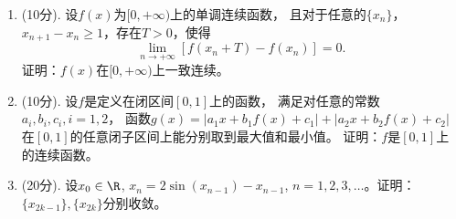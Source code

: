 \begin{enumerate}
    \item[五](10分). 设\(f(x)\)为\([0,+\infty)\)上的单调连续函数，
    且对于任意的\(\{x_n\}\)，\(x_{n+1}-x_n\ge1\)，存在\(T>0\)，使得
    \[
        \lim_{n\to+\infty}\left[f(x_n+T)-f(x_n)\right]=0.
    \]
    证明：\(f(x)\)在\([0,+\infty)\)上一致连续。
    \item[六](10分). 设\(f\)是定义在闭区间\([0,1]\)上的函数，
    满足对任意的常数\(a_i,b_i,c_i,i=1,2\)，
    函数\(g(x)=|a_1x+b_1f(x)+c_1|+|a_2x+b_2f(x)+c_2|\)
    在\([0,1]\)的任意闭子区间上能分别取到最大值和最小值。
    证明：\(f\)是\([0,1]\)上的连续函数。
    \item[七](20分). 设\(x_0\in\R\), \(x_n=2\sin(x_{n-1})-x_{n-1}\),
    \(n=1,2,3,\dots\)。证明：\(\{x_{2k-1}\},\{x_{2k}\}\)分别收敛。
\end{enumerate}

